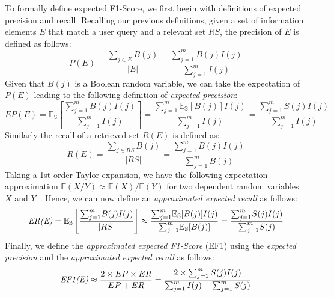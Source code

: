 To formally define expected F1-Score, we first begin with definitions of expected precision and recall.  Recalling our previous definitions, given a set of information elements  $E$  that match a user query and a relevant set $RS$, %
the precision of $E$ is defined as follows:
\begin{equation}
   P(E) = \dfrac{\sum_{j \in E} B(j)}{|E|} = \dfrac{\sum_{j=1}^m B(j)I(j)}{\sum_{j=1}^m I(j)} 
\end{equation}
Given that $B(j)$ is a Boolean random variable, we can take the expectation of $P(E)$ leading to the following definition of 
\emph{expected precision}: 
\begin{equation}
EP(E)=\mathbb{E_{S}}\left[\dfrac{{ \sum_{j=1}^{m}}B(j)I(j)}{{ \sum_{j=1}^{m}}I(j)}\right]=\dfrac{{ \sum_{j=1}^{m}}\mathbb{E_{S}}[B(j)]I(j)}{{ \sum_{j=1}^{m}}I(j)}=\dfrac{{ \sum_{j=1}^{m}}S(j)I(j)}{{ \sum_{j=1}^{m}}I(j)}
\end{equation}
Similarly the recall of a retrieved set $R(E)$ is defined as:
\begin{equation}
   R(E) = \dfrac{\sum_{j \in RS} B(j)}{|RS|} = \dfrac{\sum_{j=1}^m B(j)I(j)}{ \sum_{j=1}^m B(j)} 
\end{equation}
Taking a 1st order Taylor expansion, we have the following expectation approximation %
$\mathbb{E}(X/Y)\approx \mathbb{E}(X)/ \mathbb{E}(Y)$ for two dependent random variables $X$ and $Y$~\cite{Kempen2000}. Hence, 
we can now define an \emph{approximated expected recall} as follows: 
\begin{equation}
   \emph{ER(E)}=\mathbb{E_{S}}\left[\dfrac{{ \sum_{j=1}^{m}}B(j)I(j)}{|RS|}\right]\approx\dfrac{{ \sum_{j=1}^{m}}\mathbb{E_{S}}[B(j)]I(j)}{{ \sum_{j=1}^{m}}\mathbb{E_{S}}[B(j)]}=\dfrac{{ \sum_{j=1}^{m}}S(j)I(j)}{{ \sum_{j=1}^{m}}S(j)}
\end{equation}
Finally, we define the \emph{approximated expected F1-Score} (EF1) using the \emph{expected precision} and the \emph{approximated expected recall} as follows: 
\begin{align}
    \emph{EF1(E)}  \approx \dfrac{2\times EP\times ER}{EP+ER} = \dfrac{2\times\sum_{j=1}^m S(j)I(j)}{\sum_{j=1}^m I(j) + \sum_{j=1}^m S(j)}
    \label{eq:EF1}
\end{align}
  
